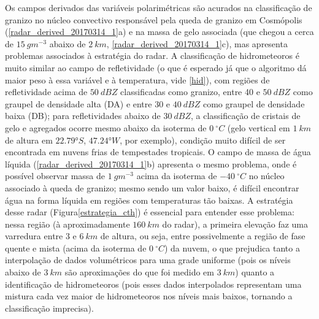 Os campos derivados das variáveis polarimétricas são acurados na classificação de granizo no núcleo convectivo responsável pela queda de granizo em Cosmópolis (\autoref{radar_derived_20170314_1}a) e na massa de gelo associada (que chegou a cerca de $15\:gm^{-3}$ abaixo de $2\:km$, \autoref{radar_derived_20170314_1}c), mas apresenta problemas associados à estratégia do radar. A classificação de hidrometeoros é muito similar ao campo de refletividade (o que é esperado já que o algoritmo dá maior peso à essa variável e à temperatura, vide \autoref{hid}), com regiões de refletividade acima de $50\:dBZ$ classificadas como granizo, entre 40 e $50\:dBZ$ como graupel de densidade alta (DA) e entre 30 e $40\:dBZ$ como graupel de densidade baixa (DB); para refletividades abaixo de $30\:dBZ$, a classificação de cristais de gelo e agregados ocorre mesmo abaixo da isoterma de $0\:^{\circ}C$ (gelo vertical em $1\:km$ de altura em $\ang{22.79}S$, $\ang{47.24}W$, por exemplo), condição muito difícil de ser encontrada em nuvens frias de tempestades tropicais. O campo de massa de água líquida (\autoref{radar_derived_20170314_1}b) apresenta o mesmo problema, onde é possível observar massa de $1\:gm^{-3}$ acima da isoterma de $-40\:^{\circ}C$ no núcleo associado à queda de granizo; mesmo sendo um valor baixo, é difícil encontrar água na forma líquida em regiões com temperaturas tão baixas. A estratégia desse radar (Figura\autoref{estrategia_cth}) é essencial para entender esse problema: nessa região (à aproximadamente $160\:km$ do radar), a primeira elevação faz uma varredura entre 3 e $6\:km$ de altura, ou seja, entre possivelmente a região de fase quente e mista (acima da isoterma de $0\:^{\circ}C$) da nuvem, o que prejudica tanto a interpolação de dados volumétricos para uma grade uniforme (pois os níveis abaixo de $3\:km$ são aproximações do que foi medido em $3\:km$) quanto a identificação de hidrometeoros (pois esses dados interpolados representam uma mistura cada vez maior de hidrometeoros nos níveis mais baixos, tornando a classificação imprecisa).

